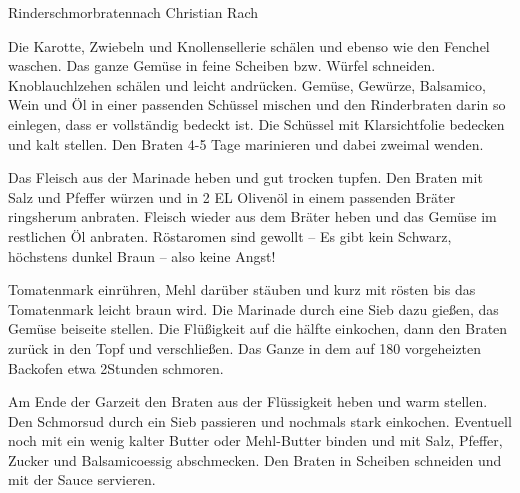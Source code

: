 \begin{recipe}{Rinderschmorbraten}{nach Christian Rach}


  \steps
  Die Karotte, Zwiebeln und Knollensellerie schälen und ebenso wie den Fenchel waschen.
  Das ganze Gemüse in feine Scheiben bzw. Würfel schneiden. Knoblauchlzehen schälen und
  leicht andrücken. Gemüse, Gewürze, Balsamico, Wein und Öl in einer passenden Schüssel
  mischen und den Rinderbraten darin so einlegen, dass er vollständig bedeckt ist. Die
  Schüssel mit Klarsichtfolie bedecken und kalt stellen. Den Braten 4-5 Tage marinieren
  und dabei zweimal wenden.

  Das Fleisch aus der Marinade heben und gut trocken tupfen. Den Braten mit Salz und
  Pfeffer würzen und in 2 EL Olivenöl in einem passenden Bräter ringsherum anbraten.
  Fleisch wieder aus dem Bräter heben und das Gemüse im restlichen Öl anbraten.
  Röstaromen sind gewollt -- Es gibt kein Schwarz, höchstens dunkel Braun -- also
  keine Angst!

  Tomatenmark einrühren, Mehl darüber stäuben und kurz mit rösten bis das Tomatenmark
  leicht braun wird. Die Marinade durch eine Sieb dazu gießen, das Gemüse beiseite
  stellen. Die Flüßigkeit auf die hälfte einkochen, dann den Braten zurück in den Topf
  und verschließen. Das Ganze in dem auf 180 \celsius vorgeheizten Backofen etwa
  2\halb Stunden schmoren.

  Am Ende der Garzeit den Braten aus der Flüssigkeit heben und warm stellen. Den
  Schmorsud durch ein Sieb passieren und nochmals stark einkochen. Eventuell noch mit
  ein wenig kalter Butter oder Mehl-Butter binden und mit Salz, Pfeffer, Zucker und
  Balsamicoessig abschmecken. Den Braten in Scheiben schneiden und mit der Sauce
  servieren.  
\end{recipe}
